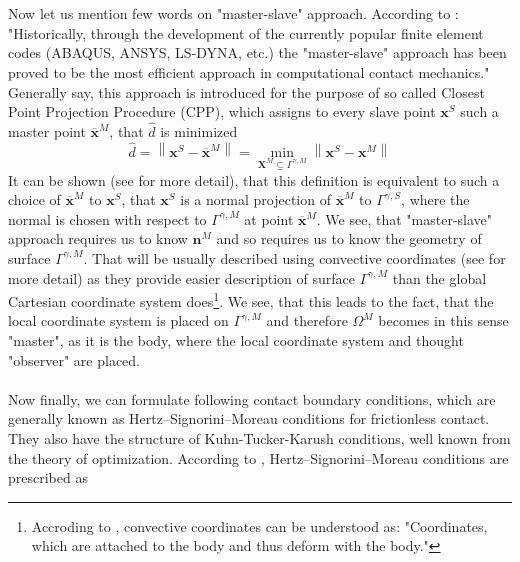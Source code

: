 \documentclass{article}
\begin{document}
\\
\\
Now let us mention few words on "master-slave" approach. According to \cite[Chapter 4, p.45-46]{Izi}: "Historically, through the development of the currently popular finite element codes (ABAQUS, ANSYS, LS-DYNA, etc.) the "master-slave" approach has been proved to be the most efficient approach in computational contact mechanics." Generally say, this approach is introduced for the purpose of so called Closest Point Projection Procedure (CPP), which assigns to every slave point $ \mathbf{x}^{S} $ such a master point $ \overline{\mathbf{x}}^{M} $, that $ \hat{d} $ is minimized
\begin{equation}\label{10}
\hat{d}=\left\|\mathbf{x}^{S}-\overline{\mathbf{x}}^{M}\right\|=\min _{\mathbf{X}^{M} \subseteq \Gamma^{\gamma,M}}\left\|\mathbf{x}^{S}-\mathbf{x}^{M}\right\|
\end{equation}
It can be shown (see \cite[Chapter 3, p.47]{Wriggers} for more detail), that this definition is equivalent to such a choice of $ \overline{\mathbf{x}}^{M} $ to $ \mathbf{x}^{S} $, that $ \mathbf{x}^{S} $ is a normal projection of $ \overline{\mathbf{x}}^{M} $ to $ \Gamma^{\gamma,S}$, where the normal is chosen with respect to $ \Gamma^{\gamma,M}$ at point $ \overline{\mathbf{x}}^{M} $. We see, that "master-slave" approach requires us to know $ \mathbf{n}^{M} $ and so requires us to know the geometry of surface $ \Gamma^{\gamma,M}$. That will be usually described using convective coordinates (see \cite[Appendix B]{Wriggers} for more detail) as they provide easier description of surface $ \Gamma^{\gamma,M}$ than the global Cartesian coordinate system does\footnote{Accroding to \cite[Appendix B, p.405]{Wriggers}, convective coordinates can be understood as: "Coordinates, which are attached to the body and thus deform with the body."}. We see, that this leads to the fact, that the local coordinate system is placed on $ \Gamma^{\gamma,M}$ and therefore $ \Omega^{M}$ becomes in this sense "master", as it is the body, where the local coordinate system and thought "observer" are placed.    
\\
\\
Now finally, we can formulate following contact boundary conditions, which are generally known as Hertz–Signorini–Moreau conditions for frictionless contact. They also have the structure of Kuhn-Tucker-Karush conditions, well known from the theory of optimization. According to \cite[Chapter 5, p.97]{Wriggers}, Hertz–Signorini–Moreau conditions are prescribed as
\end{document}

